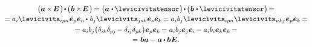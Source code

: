 \begin{otherlanguage}{russian}
\vspace{-1.1em}\begin{multline}\label{vectorcrossidentitydotvectorcrossidentity}
\bigl( \bm{a} \hspace{-0.1ex}\times\hspace{-0.25ex} \UnitDyad \hspace{.2ex}\bigr) \hspace{-0.25ex} \dotp \hspace{-0.15ex} \bigl(\hspace{.1ex} \bm{b} \hspace{-0.1ex}\times\hspace{-0.25ex} \UnitDyad \hspace{.2ex}\bigr) \hspace{-0.2ex}
= \bigl( \bm{a} \hspace{.1ex} \dotp \hspace{-0.1ex} \levicivitatensor \hspace{.1ex}\bigr) \hspace{-0.25ex} \dotp \hspace{-0.15ex} \bigl(\hspace{.1ex} \bm{b} \hspace{.1ex} \dotp \hspace{-0.1ex} \levicivitatensor \hspace{.1ex}\bigr) \hspace{-0.2ex} =
\\[-0.1em]
%
= a_i \levicivita_{ipn} \hspace{.1ex} \bm{e}_p \bm{e}_n \hspace{-0.15ex} \dotp \hspace{.2ex} b_j \levicivita_{jsk} \hspace{.1ex} \bm{e}_s \bm{e}_k \hspace{-0.2ex}
= a_i b_j \levicivita_{ipn} \levicivita_{nkj} \hspace{.05ex} \bm{e}_p \bm{e}_k \hspace{-0.2ex} =
\\[-0.1em]
%
= a_i b_j \bigl( \delta_{ik} \delta_{pj} \hspace{-0.22ex} - \delta_{i\hspace{-0.1ex}j} \delta_{pk} \bigr) \bm{e}_p \bm{e}_k \hspace{-0.2ex}
= a_i b_j \bm{e}_j \bm{e}_i \hspace{-0.12ex} - a_i b_i \bm{e}_k \bm{e}_k \hspace{-0.2ex} =
\\[-0.1em]
%
= \hspace{.1ex} \bm{b} \bm{a} - \bm{a} \hspace{-0.1ex} \dotp \bm{b} \hspace{.1ex} \UnitDyad
\hspace{.1ex} .
\end{multline}


\end{otherlanguage}
